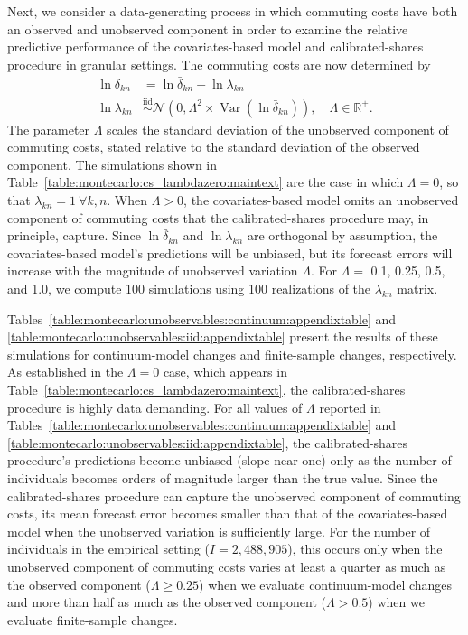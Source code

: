 \documentclass[11pt]{article}
\theoremstyle{definition}
\begin{document}
Next, we consider a data-generating process in which commuting costs have both an observed and unobserved component in order to examine the relative predictive performance of the covariates-based model and calibrated-shares procedure in granular settings.
The commuting costs are now determined by
\vspace{-0.5em}
\begin{align*}
\ln \delta_{kn} 
&=
\ln \bar{\delta}_{kn} + \ln \lambda_{kn}
\\
\ln \lambda_{kn}
& \stackrel{\text{iid}}{\sim}
\mathcal{N}\left(0,\Lambda^2 \times \operatorname{Var}(\ln \bar{\delta}_{kn})\right) ,
\quad
\Lambda \in \mathbb{R}^{+}.
\end{align*}
\vspace{-0.5em}
The parameter $\Lambda$ scales the standard deviation of the unobserved component of commuting costs, 
stated relative to the standard deviation of the observed component.
The simulations shown in Table~\ref{table:montecarlo:cs_lambdazero:maintext} are the case in which $\Lambda=0$, so that $\lambda_{kn} = 1 \ \forall k,n$.
When $\Lambda>0$, the covariates-based model omits an unobserved component of commuting costs
that the calibrated-shares procedure may, in principle, capture.
Since $\ln \bar{\delta}_{kn}$ and $\ln \lambda_{kn}$ are orthogonal by assumption,
the covariates-based model's predictions will be unbiased,
but its forecast errors will increase with the magnitude of unobserved variation $\Lambda$.
For $\Lambda =$ 0.1, 0.25, 0.5, and 1.0, we compute 100 simulations using 100 realizations of the $\lambda_{kn}$ matrix.

Tables~\ref{table:montecarlo:unobservables:continuum:appendixtable}
and \ref{table:montecarlo:unobservables:iid:appendixtable}
present the results of these simulations for continuum-model changes and finite-sample changes, respectively.
As established in the $\Lambda=0$ case,
which appears in Table~\ref{table:montecarlo:cs_lambdazero:maintext},
the calibrated-shares procedure is highly data demanding.
For all values of $\Lambda$ reported in
Tables~\ref{table:montecarlo:unobservables:continuum:appendixtable}
and \ref{table:montecarlo:unobservables:iid:appendixtable},
the calibrated-shares procedure's predictions become unbiased (slope near one) only as the number of individuals becomes orders of magnitude larger than the true value.
Since the calibrated-shares procedure can capture the unobserved component of commuting costs,
its mean forecast error becomes smaller than that of the covariates-based model
when the unobserved variation is sufficiently large.
For the number of individuals in the empirical setting ($I = 2,488,905$),
this occurs only when the unobserved component of commuting costs varies 
at least a quarter as much as the observed component ($\Lambda \geq 0.25$)
when we evaluate continuum-model changes
and
more than half as much as the observed component ($\Lambda > 0.5$)
when we evaluate finite-sample changes.
\end{document}
